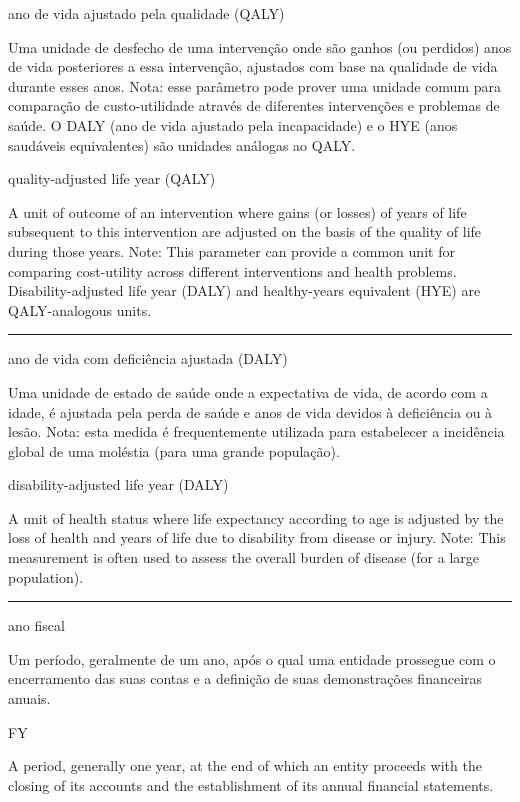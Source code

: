 \documentclass[
]{book}
\begin{document}
ano de vida ajustado pela qualidade (QALY)

Uma unidade de desfecho de uma intervenção onde são ganhos (ou perdidos) anos de vida posteriores a essa intervenção, ajustados com base na qualidade de vida durante esses anos. Nota: esse parâmetro pode prover uma unidade comum para comparação de custo-utilidade através de diferentes intervenções e problemas de saúde. O DALY (ano de vida ajustado pela incapacidade) e o HYE (anos saudáveis equivalentes) são unidades análogas ao QALY.

quality-adjusted life year (QALY)

A unit of outcome of an intervention where gains (or losses) of years of life subsequent to this intervention are adjusted on the basis of the quality of life during those years. Note: This parameter can provide a common unit for comparing cost-utility across different interventions and health problems. Disability-adjusted life year (DALY) and healthy-years equivalent (HYE) are QALY-analogous units.

\begin{center}\rule{0.5\linewidth}{0.5pt}\end{center}

ano de vida com deficiência ajustada (DALY)

Uma unidade de estado de saúde onde a expectativa de vida, de acordo com a idade, é ajustada pela perda de saúde e anos de vida devidos à deficiência ou à lesão. Nota: esta medida é frequentemente utilizada para estabelecer a incidência global de uma moléstia (para uma grande população).

disability-adjusted life year (DALY)

A unit of health status where life expectancy according to age is adjusted by the loss of health and years of life due to disability from disease or injury. Note: This measurement is often used to assess the overall burden of disease (for a large population).

\begin{center}\rule{0.5\linewidth}{0.5pt}\end{center}

ano fiscal

Um período, geralmente de um ano, após o qual uma entidade prossegue com o encerramento das suas contas e a definição de suas demonstrações financeiras anuais.

FY

A period, generally one year, at the end of which an entity proceeds with the closing of its accounts and the establishment of its annual financial statements.
\end{document}
